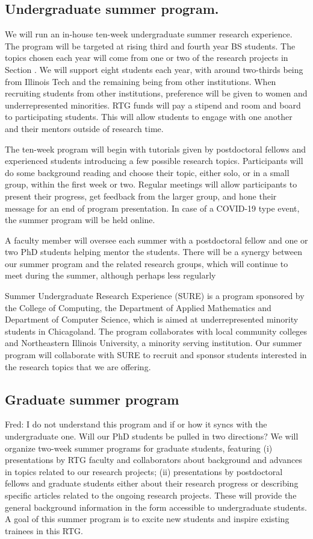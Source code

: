 \documentclass[11pt]{NSFamsart}
\newcommand{\FredNote}[1]{{\color{blue} Fred: #1}}
\begin{document}
\subsection*{Undergraduate summer program.}
We will run an in-house ten-week undergraduate summer research experience.  The program will be targeted at rising third and fourth year BS students.  The topics chosen each year will come from one or two of the research projects in Section \label{sec:researchproblems}.  We will support eight students each year, with around two-thirds being from Illinois Tech and the remaining being from other institutions.  When recruiting students from other institutions, preference will be given to women and underrepresented minorities.  RTG funds
will pay a stipend and room and board to participating students.  This will allow students to engage with one another and their mentors outside of research time.  

The ten-week program will begin with tutorials given by postdoctoral fellows and experienced students introducing a few possible research topics.  Participants will do some background reading and choose their topic, either solo, or in a small group, within the first week or two.  Regular meetings will allow participants to present their progress, get feedback from the larger group, and hone their message for an end of program presentation. In case of a COVID-19 type event, the summer program will be held online.

A faculty member will oversee each summer with a postdoctoral fellow and one or two PhD students helping mentor the students.  There will be a synergy between our summer program and the related research groups, which will continue to meet during the summer, although perhaps less regularly

Summer Undergraduate Research Experience (SURE) is a program sponsored by the College of Computing, the Department of Applied
Mathematics and Department of Computer Science, which is aimed at underrepresented minority students in Chicagoland.  The program collaborates with local community colleges and Northeastern Illinois University, a minority serving institution.  Our summer program will collaborate with SURE to recruit and sponsor students interested in the research topics that we are offering.
 
 
\subsection*{Graduate summer program} \FredNote{I do not understand this program and if or how it syncs with the undergraduate one.  Will our PhD students be pulled in two directions?} We will organize two-week summer programs for  graduate students, featuring (i) presentations by RTG faculty and collaborators about background and advances  in topics related to our research  projects; (ii) presentations by postdoctoral fellows and graduate students either about their research progress or describing specific articles related to the ongoing research projects. These will provide the general background
information in the form accessible to undergraduate students.  A goal of   this summer program is to excite new students and inspire existing trainees in this RTG. 
\end{document}
